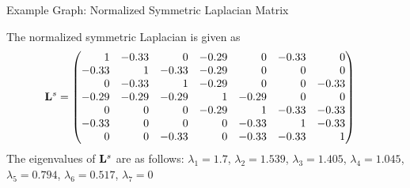 \begin{frame}{Example Graph: Normalized Symmetric Laplacian Matrix}
\begin{figure}
    \centerline{
	}
		\vspace{-0.2in}
 \end{figure}
\small
The    normalized symmetric Laplacian is given as
    \begin{align*}
        \bL^s & = \amatr{r}{
     1 &-0.33 & 0 &-0.29 & 0 &-0.33 & 0\\
    -0.33 & 1 &-0.33 &-0.29 & 0 & 0 & 0\\
     0 &-0.33 & 1 &-0.29 & 0 & 0 &-0.33\\
    -0.29 &-0.29 &-0.29 & 1 &-0.29 & 0 & 0\\
     0 & 0 & 0 &-0.29 & 1 &-0.33 &-0.33\\
    -0.33 & 0 & 0 & 0 &-0.33 & 1 &-0.33\\
     0 & 0 &-0.33 & 0 &-0.33 &-0.33 & 1\\
    }
    \end{align*}
    The eigenvalues of $\mathbf{L}^s$ are as follows:
    $\lambda_1 = 1.7$,
    $\lambda_2 =1.539$,
    $\lambda_3 = 1.405$,
    $\lambda_4 =1.045$,
    $\lambda_5 =0.794$,
    $\lambda_6 =0.517$,
    $\lambda_7 = 0 $
\end{frame}



